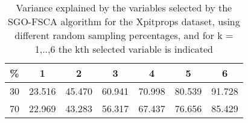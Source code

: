 \begin{table}
	\begin{center}
		\begin{tabular}{c c c c c c c}
			\% & 1 & 2 & 3 & 4 & 5 & 6 \\
			\hline
			30 & 23.516 & 45.470 & 60.941 & 70.998 & 80.539 & 91.728 \\
			70 & 22.969 & 43.283 & 56.317 & 67.437 & 76.656 & 85.429 \\
		\end{tabular}
	\end{center}
	\caption{Variance explained by the variables selected by the SGO-FSCA algorithm for the Xpitprops dataset, using different random sampling percentages, and for k = 1,..,6 the kth selected variable is indicated}
\end{table}